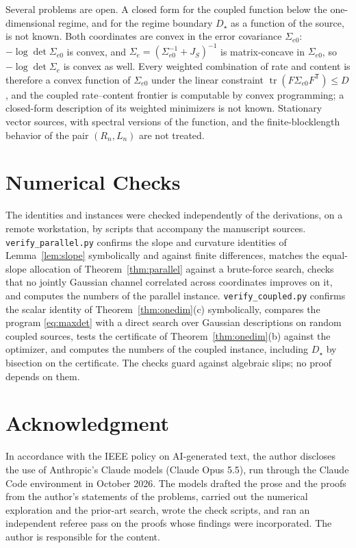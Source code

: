 \documentclass[11pt,onecolumn]{IEEEtran}
\newcommand{\tr}{\operatorname{tr}}
\begin{document}
Several problems are open. A closed form for the coupled function below
the one-dimensional regime, and for the regime boundary $D_\star$ as a
function of the source, is not known. Both coordinates are convex in the error covariance $\Sigma_{e0}$:
$-\log\det\Sigma_{e0}$ is convex, and $\Sigma_e=(\Sigma_{e0}^{-1}+J_S)^{-1}$ is
matrix-concave in $\Sigma_{e0}$, so $-\log\det\Sigma_e$ is convex as well. Every
weighted combination of rate and content is therefore a convex function of
$\Sigma_{e0}$ under the linear constraint $\tr(F\Sigma_{e0}F^{\mathsf T})\le D$,
and the coupled rate--content frontier is computable by convex
programming; a closed-form description of its weighted minimizers is not
known.
Stationary vector sources, with spectral versions of the function, and
the finite-blocklength behavior of the pair $(R_n,L_n)$ are not treated.

\appendices
\section{Numerical Checks}
\label{app:numver}

The identities and instances were checked independently of the
derivations, on a remote workstation, by scripts that accompany the
manuscript sources. \texttt{verify\_parallel.py} confirms the slope and
curvature identities of Lemma~\ref{lem:slope} symbolically and against
finite differences, matches the equal-slope allocation of
Theorem~\ref{thm:parallel} against a brute-force search, checks that no
jointly Gaussian channel correlated across coordinates improves on it,
and computes the numbers of the parallel instance.
\texttt{verify\_coupled.py} confirms the scalar identity of
Theorem~\ref{thm:onedim}(c) symbolically, compares the program
\eqref{eq:maxdet} with a direct search over Gaussian descriptions on
random coupled sources, tests the certificate of
Theorem~\ref{thm:onedim}(b) against the optimizer, and computes the
numbers of the coupled instance, including $D_\star$ by bisection on the
certificate. The checks guard against algebraic slips; no proof depends
on them.

\section*{Acknowledgment}

In accordance with the IEEE policy on AI-generated text, the author
discloses the use of Anthropic's Claude models (Claude Opus 5.5), run
through the Claude Code environment in October 2026. The models drafted
the prose and the proofs from the author's statements of the problems,
carried out the numerical exploration and the prior-art search, wrote the
check scripts, and ran an independent referee pass on the proofs whose
findings were incorporated. The author is responsible for the content.
\end{document}
